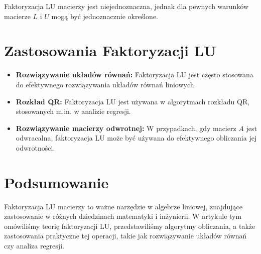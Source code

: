 \documentclass[12pt]{article}
\begin{document}
\begin{theorem}
Faktoryzacja LU macierzy jest niejednoznaczna, jednak dla pewnych warunków macierze $L$ i $U$ mogą być jednoznacznie określone.
\end{theorem}

\section{Zastosowania Faktoryzacji LU}
\begin{itemize}
  \item \textbf{Rozwiązywanie układów równań:} Faktoryzacja LU jest często stosowana do efektywnego rozwiązywania układów równań liniowych.
  
  \item \textbf{Rozkład QR:} Faktoryzacja LU jest używana w algorytmach rozkładu QR, stosowanych m.in. w analizie regresji.
  
  \item \textbf{Rozwiązywanie macierzy odwrotnej:} W przypadkach, gdy macierz $A$ jest odwracalna, faktoryzacja LU może być używana do efektywnego obliczania jej odwrotności.
\end{itemize}

\section{Podsumowanie}
Faktoryzacja LU macierzy to ważne narzędzie w algebrze liniowej, znajdujące zastosowanie w różnych dziedzinach matematyki i inżynierii. W artykule tym omówiliśmy teorię faktoryzacji LU, przedstawiliśmy algorytmy obliczania, a także zastosowania praktyczne tej operacji, takie jak rozwiązywanie układów równań czy analiza regresji.
\end{document}
